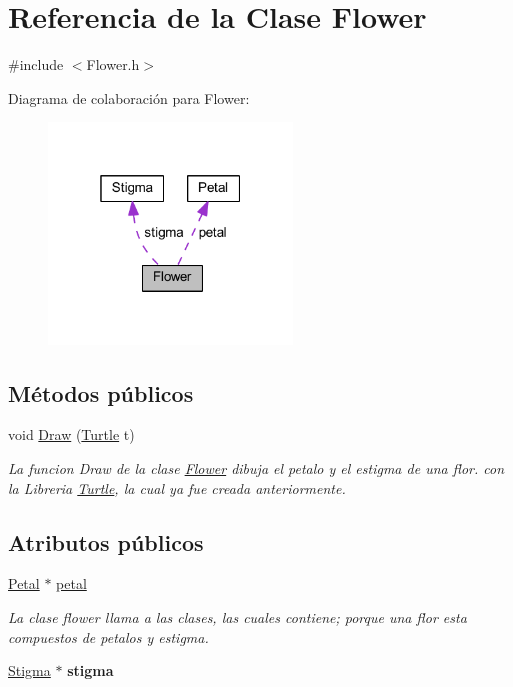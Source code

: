 \hypertarget{class_flower}{}\section{Referencia de la Clase Flower}
\label{class_flower}


{\ttfamily \#include $<$Flower.\+h$>$}



Diagrama de colaboración para Flower\+:
\nopagebreak
\begin{figure}[H]
\begin{center}
\leavevmode
\includegraphics[width=184pt]{class_flower__coll__graph}
\end{center}
\end{figure}
\subsection*{Métodos públicos}
\begin{DoxyCompactItemize}
\item 
void \mbox{\hyperlink{class_flower_aa7dd1098de847a6d210e10bc64dfcf31}{Draw}} (\mbox{\hyperlink{class_turtle}{Turtle}} t)
\begin{DoxyCompactList}\small\item\em La funcion Draw de la clase \mbox{\hyperlink{class_flower}{Flower}} dibuja el petalo y el estigma de una flor. con la Libreria \mbox{\hyperlink{class_turtle}{Turtle}}, la cual ya fue creada anteriormente. \end{DoxyCompactList}\end{DoxyCompactItemize}
\subsection*{Atributos públicos}
\begin{DoxyCompactItemize}
\item 
\mbox{\hyperlink{class_petal}{Petal}} $\ast$ \mbox{\hyperlink{class_flower_af0f1dc8c951cb056cf77409ca06d96f7}{petal}}
\begin{DoxyCompactList}\small\item\em La clase flower llama a las clases, las cuales contiene; porque una flor esta compuestos de petalos y estigma. \end{DoxyCompactList}\item 
\mbox{\label{class_flower_a691f3890594faacb64c9cea88be1c8d0}} 
\mbox{\hyperlink{class_stigma}{Stigma}} $\ast$ {\bfseries stigma}
\end{DoxyCompactItemize}


